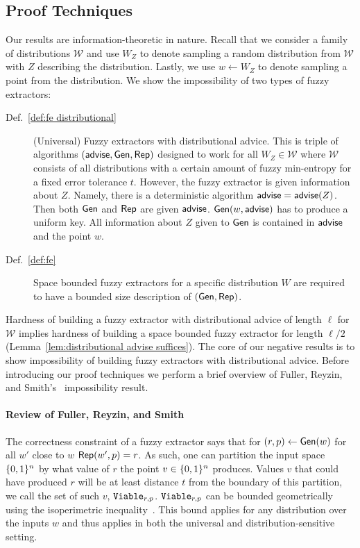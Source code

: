 \subsection{Proof Techniques}
Our results are information-theoretic in nature. Recall that we consider a family of distributions $\mathcal{W}$ and use $W_Z$ to denote sampling a random distribution from $\mathcal{W}$ with $Z$ describing the distribution.  Lastly, we use $w\leftarrow W_Z$ to denote sampling a point from the distribution.  We show the impossibility of two types of fuzzy extractors:
\begin{description}
\item[Def.~\ref{def:fe distributional}] (Universal) Fuzzy extractors with distributional advice.  This is triple of algorithms $({\mathsf{advise}}, {\mathsf{Gen}}, {\mathsf{Rep}})$ designed to work for all $W_Z \in \mathcal{W}$ where $\mathcal{W}$ consists of all distributions with a certain amount of fuzzy min-entropy for a fixed error tolerance $t$.  However, the fuzzy extractor is given information about $Z$.  Namely, there is a deterministic algorithm ${\mathsf{advise}} = {\mathsf{advise}}(Z)$. Then both ${\mathsf{Gen}}$ and ${\mathsf{Rep}}$ are given ${\mathsf{advise}}$. ${\mathsf{Gen}}(w, {\mathsf{advise}})$ has to produce a uniform key.  All information about $Z$ given to ${\mathsf{Gen}}$ is contained in ${\mathsf{advise}}$ and the point $w$.
\item[Def.~\ref{def:fe}] Space bounded fuzzy extractors for a specific distribution $W$ are required to have a bounded size description of $({\mathsf{Gen}}, {\mathsf{Rep}})$.
\end{description}

Hardness of building a fuzzy extractor with distributional advice of length $\ell$ for $\mathcal{W}$ implies hardness of building a space bounded fuzzy extractor for length $\ell/2$ (Lemma~\ref{lem:distributional advise suffices}). 
The core of our negative results is to show impossibility of building fuzzy extractors with distributional advice.   Before introducing our proof techniques we perform a brief overview of Fuller, Reyzin, and Smith's~\cite{fuller2020fuzzy} impossibility result.

\paragraph{Review of Fuller, Reyzin, and Smith~\cite{fuller2020fuzzy}}
The correctness constraint of a fuzzy extractor says that for $(r, p)\leftarrow {\ensuremath{\mathsf{Gen}}}(w)$ for all $w'$ close to $w$ ${\mathsf{Rep}}(w', p)=r$.  As such, one can partition the input space $\{0, 1\}^n$ by what value of $r$ the point  $v\in \{0, 1\}^n$ produces.  Values $v$ that could have produced  $r$ will be at least distance $t$ from the boundary of this partition, we call the set of such $v$, $\mathtt{Viable}_{r,p}$.  $\mathtt{Viable}_{r,p}$ can be bounded geometrically using the isoperimetric inequality~\cite{harper1966optimal}.  This bound applies for any distribution over the inputs $w$ and thus applies in  both the universal and distribution-sensitive setting.



